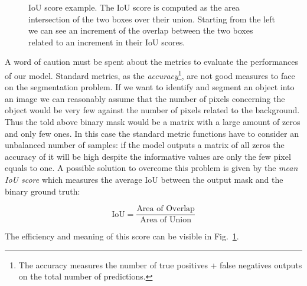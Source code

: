 \documentclass{standalone}
\begin{document}
\begin{center}
\begin{figure}[htbp]
\centering
\def\svgwidth{0.85\textwidth}

\caption{IoU score example.
The IoU score is computed as the area intersection of the two boxes over their union.
Starting from the left we can see an increment of the overlap between the two boxes related to an increment in their IoU scores.
}
\label{fig:iou_example}
\end{figure}
\end{center}

A word of caution must be spent about the metrics to evaluate the performances of our model.
Standard metrics, as the \emph{accuracy}\footnote{
  The accuracy measures the number of true positives + false negatives outputs on the total number of predictions.
}, are not good measures to face on the segmentation problem.
If we want to identify and segment an object into an image we can reasonably assume that the number of pixels concerning the object would be very few against the number of pixels related to the background.
Thus the told above binary mask would be a matrix with a large amount of zeros and only few ones.
In this case the standard metric functions have to consider an unbalanced number of samples: if the model outputs a matrix of all zeros the accuracy of it will be high despite the informative values are only the few pixel equals to one.
A possible solution to overcome this problem is given by the \emph{mean IoU score} which measures the average IoU between the output mask and the binary ground truth:

$$
\mbox{IoU} = \frac{\mbox{Area of Overlap}}{\mbox{Area of Union}}
$$

The efficiency and meaning of this score can be visible in Fig.~\ref{fig:iou_example}.
\end{document}
